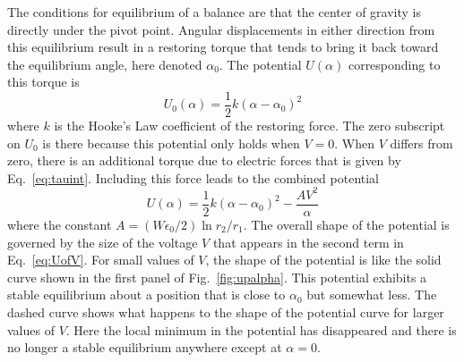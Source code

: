 \documentclass{revtex4}
\begin{document}
The conditions for equilibrium of a balance are that the center of gravity
is directly under the pivot point.  Angular displacements in either direction
from this equilibrium result in a restoring torque that tends to bring it
back toward the equilibrium angle, here denoted $\alpha_0$.  The potential
$U(\alpha)$ corresponding to this torque is
\begin{equation}
U_0(\alpha) = \frac{1}{2}k(\alpha-\alpha_0)^2
\label{eq:U0}
\end{equation}
where $k$ is the Hooke's Law coefficient of the restoring force.  The
zero subscript on $U_0$ is there because this potential only holds when
$V=0$.  When $V$ differs from zero, there is an additional torque due to
electric forces that is given by Eq.~\ref{eq:tauint}.  Including this
force leads to the combined potential 
\begin{equation}
U(\alpha) = \frac{1}{2}k(\alpha-\alpha_0)^2 - \frac{AV^2}{\alpha}
\label{eq:UofV}
\end{equation}
where the constant $A=(W\epsilon_0/2)\ln{r_2/r_1}$.  The overall shape
of the potential is governed by the size of the voltage $V$ that appears
in the second term in Eq.~\ref{eq:UofV}.  For small values of $V$, the
shape of the potential is like the solid curve shown in the first panel
of Fig.~\ref{fig:upalpha}.  This potential exhibits a stable equilibrium
about a position that is close to $\alpha_0$ but somewhat less.  The dashed
curve shows what happens to the shape of the potential curve for larger
values of $V$.  Here the local minimum in the potential has disappeared
and there is no longer a stable equilibrium anywhere except at $\alpha=0$.
\end{document}
